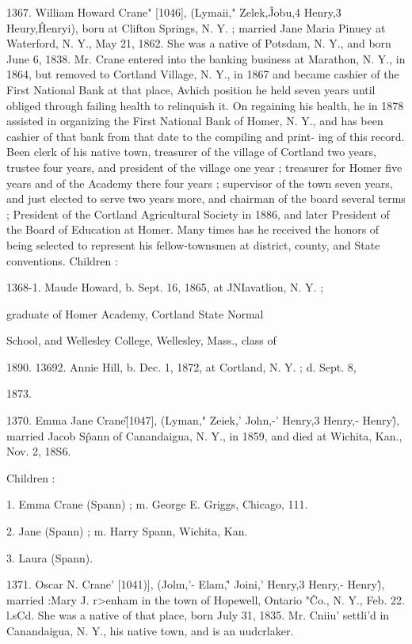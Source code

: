 1367. William Howard Crane" [1046], (Lymaii," Zelek,\^ 
Jobu,4 Henry,3 Heury,\^ Henryi), boru at Clifton Springs, N. Y. ; 
married Jane Maria Pinuey at Waterford, N. Y., May 21, 1862. 
She was a native of Potsdam, N. Y., and born June 6, 1838. 
Mr. Crane entered into the banking business at Marathon, N. Y., 
in 1864, but removed to Cortland Village, N. Y., in 1867 and 
became cashier of the First National Bank at that place, Avhich 
position he held seven years until obliged through failing health 
to relinquish it. On regaining his health, he in 1878 assisted in 
organizing the First National Bank of Homer, N. Y., and has 
been cashier of that bank from that date to the compiling and print- 
ing of this record. Been clerk of his native town, treasurer of 
the village of Cortland two years, trustee four years, and president 
of the village one year ; treasurer for Homer five years and of the 
Academy there four years ; supervisor of the town seven years, 
and just elected to serve two years more, and chairman of the 
board several terms ; President of the Cortland Agricultural 
Society in 1886, and later President of the Board of Education 
at Homer. Many times has he received the honors of being 
selected to represent his fellow-townsmen at district, county, and 
State conventions. Children : 

1368-1. Maude Howard, b. Sept. 16, 1865, at JNIavatlion, N. Y. ; 

graduate of Homer Academy, Cortland State Normal 

School, and Wellesley College, Wellesley, Mass., class of 

1890. 
13692. Annie Hill, b. Dec. 1, 1872, at Cortland, N. Y. ; d. Sept. 8, 

1873. 

1370. Emma Jane Crane\^ [1047], (Lyman," Zeiek,' John,-' 
Henry,3 Henry,- Henry\^), married Jacob S\^pann of Canandaigua, 
N. Y., in 1859, and died at Wichita, Kan., Nov. 2, 18S6. 

Children : 

1. Emma Crane (Spann) ; m. George E. Griggs, Chicago, 111. 

2. Jane (Spann) ; m. Harry Spann, Wichita, Kan. 

3. Laura (Spann). 

1371. Oscar N. Crane' [1041)], (Jolm,'- Elam,\^' Joini,' 
Henry,3 Henry,- Henry\^), married :Mary J. r>enham in the town 
of Hopewell, Ontario "\^ Co., N. Y., Feb. 22. l.sCd. She was a 
native of that place, born July 31, 1835. Mr. Cniiu' settli'd in 
Canandaigua, N. Y., his native town, and is an uudcrlaker. 

